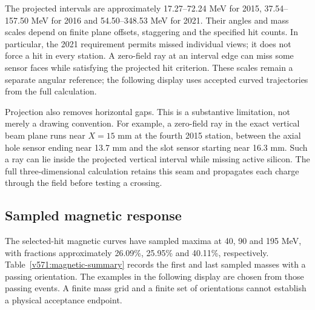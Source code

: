 \begin{table}[H]
\centering\small

\caption{Zero-field projected vertical aperture of the selected LCDD geometry with the
run-dependent hit requirements of Table~\ref{v571:hit-selection}.
The angular scan spacing is 0.002 mrad. These are
equal-sharing mass scales in a two-dimensional projection. They are not the
mass endpoints of the full geometry with magnetic transport.}
\label{v571:scales}
\end{table}

The projected intervals are approximately 17.27--72.24 MeV for 2015,
37.54--157.50 MeV for 2016 and 54.50--348.53 MeV for 2021. Their angles and
mass scales depend on finite plane offsets, staggering and the specified hit
counts. In particular, the 2021 requirement permits missed individual views;
it does not force a hit in every station. A zero-field ray at an interval
edge can miss some sensor faces while satisfying the projected hit criterion.
These scales remain a separate angular reference; the following display
uses accepted curved trajectories from the full calculation.

Projection also removes horizontal gaps. This is a substantive limitation,
not merely a drawing convention. For example, a zero-field ray in the exact
vertical beam plane runs near $X=15$ mm at the fourth 2015 station, between
the axial hole sensor ending near 13.7 mm and the slot sensor starting near
16.3 mm. Such a ray can lie inside the projected vertical interval while
missing active silicon. The full three-dimensional calculation retains this
seam and propagates each charge through the field before testing a crossing.

\subsection{Sampled magnetic response}
\label{v571:sampled-response}
The selected-hit magnetic curves have sampled maxima at 40, 90 and 195 MeV,
with fractions approximately 26.09\%, 25.95\% and 40.11\%, respectively.
Table~\ref{v571:magnetic-summary} records the first and last sampled masses
with a passing orientation. The examples in the following display are
chosen from those passing events. A finite mass grid and a finite set of
orientations cannot establish a physical acceptance endpoint.



